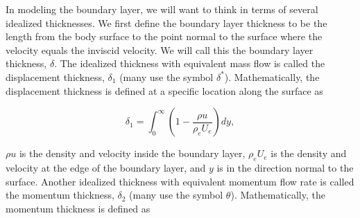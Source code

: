 \begin{assumption}{}
    \label{asm:adiabatic_walls}




\end{assumption}

\begin{assumption}{}
    \label{asm:isentropic_flow}




\end{assumption}


In modeling the boundary layer, we will want to think in terms of several idealized thicknesses.
We first define the boundary layer thickness to be the length from the body surface to the point normal to the surface where the velocity equals the inviscid velocity.
We will call this the boundary layer thickness, \(\delta\).
The idealized thickness with equivalent mass flow is called the displacement thickness, \(\delta_1\) (many use the symbol \(\delta^*\)).
Mathematically, the displacement thickness is defined at a specific location along the surface as

\begin{equation}
    \delta_1 = \int_0^\infty \left(1-\frac{\rho u}{\rho_e U_e}\right)dy,
\end{equation}

\where \(\rho u\) is the density and velocity inside the boundary layer,
\(\rho_e U_e\) is the density and velocity at the edge of the boundary layer,
and \(y\) is in the direction normal to the surface.
Another idealized thickness with equivalent momentum flow rate is called the momentum thickness, \(\delta_2\) (many use the symbol \(\theta\)).
Mathematically, the momentum thickness is defined as

